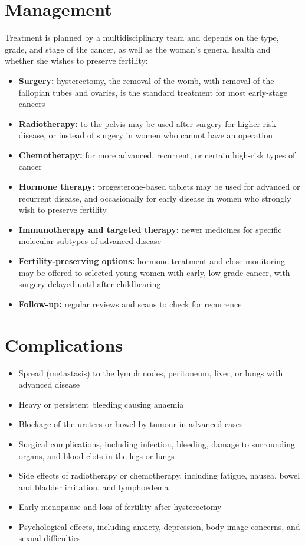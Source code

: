 \section*{Management}
Treatment is planned by a multidisciplinary team and depends on the type, grade, and stage of the cancer, as well as the woman's general health and whether she wishes to preserve fertility:
\begin{itemize}
    \item \textbf{Surgery:} hysterectomy, the removal of the womb, with removal of the fallopian tubes and ovaries, is the standard treatment for most early-stage cancers
    \item \textbf{Radiotherapy:} to the pelvis may be used after surgery for higher-risk disease, or instead of surgery in women who cannot have an operation
    \item \textbf{Chemotherapy:} for more advanced, recurrent, or certain high-risk types of cancer
    \item \textbf{Hormone therapy:} progesterone-based tablets may be used for advanced or recurrent disease, and occasionally for early disease in women who strongly wish to preserve fertility
    \item \textbf{Immunotherapy and targeted therapy:} newer medicines for specific molecular subtypes of advanced disease
    \item \textbf{Fertility-preserving options:} hormone treatment and close monitoring may be offered to selected young women with early, low-grade cancer, with surgery delayed until after childbearing
    \item \textbf{Follow-up:} regular reviews and scans to check for recurrence
\end{itemize}

\section*{Complications}
\begin{itemize}
    \item Spread (metastasis) to the lymph nodes, peritoneum, liver, or lungs with advanced disease
    \item Heavy or persistent bleeding causing anaemia
    \item Blockage of the ureters or bowel by tumour in advanced cases
    \item Surgical complications, including infection, bleeding, damage to surrounding organs, and blood clots in the legs or lungs
    \item Side effects of radiotherapy or chemotherapy, including fatigue, nausea, bowel and bladder irritation, and lymphoedema
    \item Early menopause and loss of fertility after hysterectomy
    \item Psychological effects, including anxiety, depression, body-image concerns, and sexual difficulties
\end{itemize}

